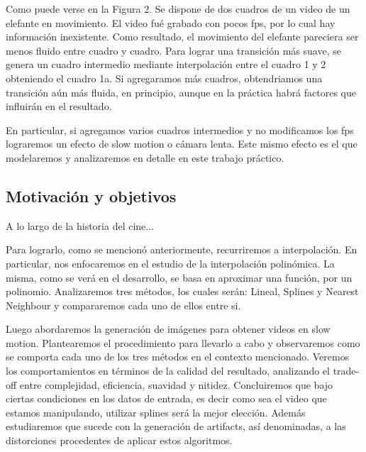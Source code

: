 Como puede verse en la Figura 2. Se dispone de dos cuadros de un video de un elefante en movimiento. El video fué grabado con pocos fps, por lo cual hay información inexistente. Como resultado, el movimiento del elefante pareciera ser menos fluido entre cuadro y cuadro. Para lograr una transición más suave, se genera un cuadro intermedio mediante interpolación entre el cuadro 1 y 2 obteniendo el cuadro 1a. Si agregaramos más cuadros, obtendriamos una transición aún más fluida, en principio, aunque en la práctica habrá factores que influirán en el resultado. 

En particular, si agregamos varios cuadros intermedios y no modificamos los fps lograremos un efecto de slow motion o cámara lenta. Este mismo efecto es el que modelaremos y analizaremos en detalle en este trabajo práctico.

\subsection{Motivación y objetivos}

A lo largo de la historia del cine... 

Para lograrlo, como se mencionó anteriormente, recurriremos a interpolación.
En particular, nos enfocaremos en el estudio de la interpolación polinómica. 
La misma, como se verá en el desarrollo, se basa en aproximar una función, por un polinomio. Analizaremos tres métodos, los cuales serán:  Lineal, Splines y Nearest Neighbour y compararemos cada uno de ellos entre si.

Luego abordaremos la generación de imágenes para obtener videos en slow motion.
Plantearemos el procedimiento para llevarlo a cabo y observaremos como se comporta cada uno de los tres métodos en el contexto mencionado. Veremos los comportamientos en términos de la calidad del resultado, analizando el trade-off entre complejidad, eficiencia, suavidad y nitidez. Concluiremos que bajo ciertas condiciones en los datos de entrada, es decir como sea el video que estamos manipulando, utilizar splines será la mejor elección. 
Además estudiaremos que sucede con la generación de artifacts, así denominadas, a las distorciones procedentes de aplicar estos algoritmos.